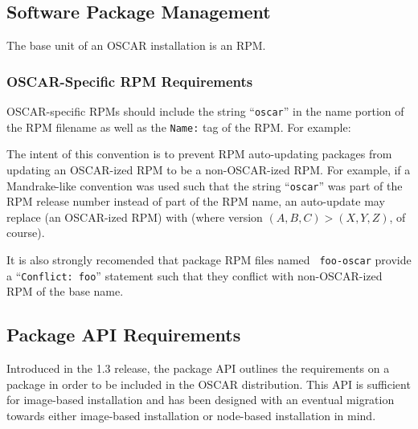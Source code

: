 
\subsection{Software Package Management}
\label{sec:design-software-package-mgmt}

The base unit of an OSCAR installation is an RPM.  

\subsubsection{OSCAR-Specific RPM Requirements}
\label{sec:design-software-package-mgmt-rpm-reqs}

OSCAR-specific RPMs should include the string ``{\tt oscar}'' in the
name portion of the RPM filename as well as the {\tt Name:} tag of the
RPM.  For example:

\vspace{10pt}
\centerline{}
\vspace{10pt}

The intent of this convention is to prevent RPM auto-updating packages
from updating an OSCAR-ized RPM to be a non-OSCAR-ized RPM.  For
example, if a Mandrake-like convention was used such that the string
``{\tt oscar}'' was part of the RPM release number instead of part of
the RPM name, an auto-update may replace  (an OSCAR-ized RPM) with
 (where version
$(A, B, C) > (X, Y, Z)$, of course).

It is also strongly recomended that package RPM files named {\tt
  foo-oscar} provide a ``{\tt Conflict: foo}'' statement such that
they conflict with non-OSCAR-ized RPM of the base name.


\subsection{Package API Requirements}

Introduced in the 1.3 release, the package API outlines the
requirements on a package in order to be included in the OSCAR
distribution.  This API is sufficient for image-based installation and
has been designed with an eventual migration towards either
image-based installation or node-based installation in mind.

